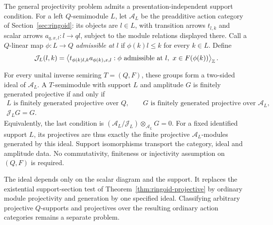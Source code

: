 The general projectivity problem admits a presentation-independent support
condition. For a left $Q$-semimodule $L$, let $\mathcal A_L$ be the
preadditive action category of Section~\ref{sec:ringoid}: its objects are
$l\in L$, with transition arrows $t_{l,k}$ and scalar arrows
$a_{q,x,l}:l\to ql$, subject to the module relations displayed there.
Call a $Q$-linear map $\phi:L\to Q$ \emph{admissible at $l$} if
$\phi(k)l\leq k$ for every $k\in L$. Define
\[
 \mathcal J_L(l,k)=
 \left\langle
 t_{\phi(k)l,k}a_{\phi(k),x,l}:
 \phi\text{ admissible at }l,\ x\in F(\phi(k))
 \right\rangle_{\mathbb Z}.
\]
\begin{theorem}\label{thm:canonical-ideal}
For every unital inverse semiring $T=(Q,F)$, these groups form a
two-sided ideal of $\mathcal A_L$. A $T$-semimodule with support $L$ and
amplitude $G$ is finitely generated projective if and only if
\begin{gather*}
 L\text{ is finitely generated projective over }Q,\qquad
 G\text{ is finitely generated projective over }\mathcal A_L,\\
 \mathcal J_LG=G.
\end{gather*}
Equivalently, the last condition is
$(\mathcal A_L/\mathcal J_L)\otimes_{\mathcal A_L}G=0$.
For a fixed identified support $L$, its projectives are thus exactly the
finite projective $\mathcal A_L$-modules generated by this ideal.
Support isomorphisms transport the category, ideal and amplitude data.
No commutativity, finiteness or injectivity assumption on $(Q,F)$ is required.
\end{theorem}
The ideal depends only on the scalar diagram and the support. It replaces
the existential support-section test of Theorem~\ref{thm:ringoid-projective}
by ordinary module projectivity and generation by one specified ideal.
Classifying arbitrary projective $Q$-supports and projectives over the
resulting ordinary action categories remains a separate problem.
